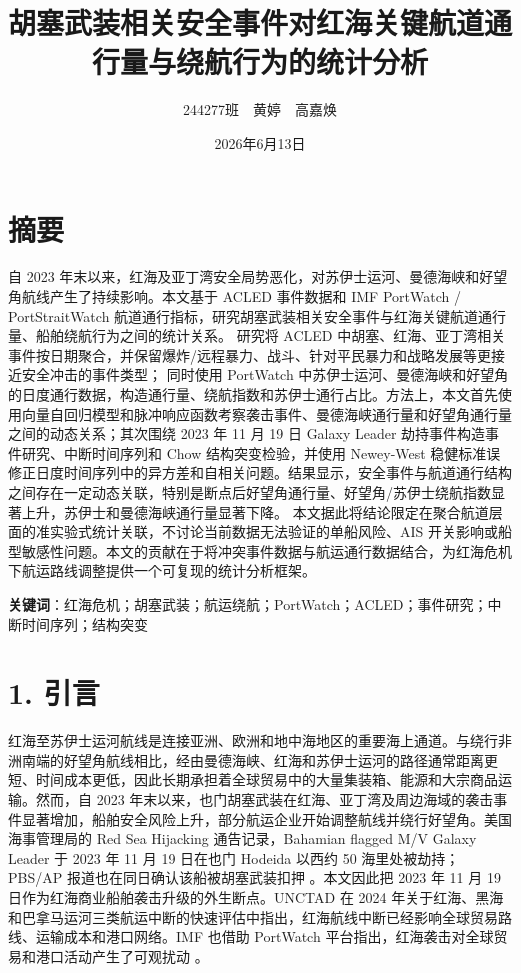 \documentclass[
]{ctexart}
\title{胡塞武装相关安全事件对红海关键航道通行量与绕航行为的统计分析}
\author{244277班　黄婷　高嘉焕}
\date{2026年6月13日}
\begin{document}
\maketitle

{
\hypersetup{linkcolor=}
\setcounter{tocdepth}{3}
\tableofcontents
}

\newpage

\section{摘要}\label{ux6458ux8981}

自 2023 年末以来，红海及亚丁湾安全局势恶化，对苏伊士运河、曼德海峡和好望角航线产生了持续影响。本文基于
ACLED 事件数据和 IMF PortWatch / PortStraitWatch 航道通行指标，研究胡塞武装相关安全事件与红海关键航道通行量、船舶绕航行为之间的统计关系。
研究将 ACLED 中胡塞、红海、亚丁湾相关事件按日期聚合，并保留爆炸/远程暴力、战斗、针对平民暴力和战略发展等更接近安全冲击的事件类型；
同时使用 PortWatch 中苏伊士运河、曼德海峡和好望角的日度通行数据，构造通行量、绕航指数和苏伊士通行占比。方法上，本文首先使用向量自回归模型和脉冲响应函数考察袭击事件、曼德海峡通行量和好望角通行量之间的动态关系；其次围绕
2023 年 11 月 19 日 Galaxy Leader 劫持事件构造事件研究、中断时间序列和 Chow 结构突变检验，并使用 Newey-West
稳健标准误修正日度时间序列中的异方差和自相关问题。结果显示，安全事件与航道通行结构之间存在一定动态关联，特别是断点后好望角通行量、好望角/苏伊士绕航指数显著上升，苏伊士和曼德海峡通行量显著下降。
本文据此将结论限定在聚合航道层面的准实验式统计关联，不讨论当前数据无法验证的单船风险、AIS 开关影响或船型敏感性问题。本文的贡献在于将冲突事件数据与航运通行数据结合，为红海危机下航运路线调整提供一个可复现的统计分析框架。

\textbf{关键词}：红海危机；胡塞武装；航运绕航；PortWatch；ACLED；事件研究；中断时间序列；结构突变

\newpage

\section{1. 引言}\label{ux5f15ux8a00}

红海至苏伊士运河航线是连接亚洲、欧洲和地中海地区的重要海上通道。与绕行非洲南端的好望角航线相比，经由曼德海峡、红海和苏伊士运河的路径通常距离更短、时间成本更低，因此长期承担着全球贸易中的大量集装箱、能源和大宗商品运输。然而，自
2023
年末以来，也门胡塞武装在红海、亚丁湾及周边海域的袭击事件显著增加，船舶安全风险上升，部分航运企业开始调整航线并绕行好望角。美国海事管理局的
Red Sea Hijacking 通告记录，Bahamian flagged M/V Galaxy Leader 于 2023
年 11 月 19 日在也门 Hodeida 以西约 50 海里处被劫持；PBS/AP
报道也在同日确认该船被胡塞武装扣押 \citep{marad2023redsea,pbs2023houthi}。本文因此把 2023 年 11 月 19
日作为红海商业船舶袭击升级的外生断点。UNCTAD 在 2024
年关于红海、黑海和巴拿马运河三类航运中断的快速评估中指出，红海航线中断已经影响全球贸易路线、运输成本和港口网络。IMF
也借助 PortWatch 平台指出，红海袭击对全球贸易和港口活动产生了可观扰动
\citep{unctad2024troubled,imf2024redsea}。
\end{document}
